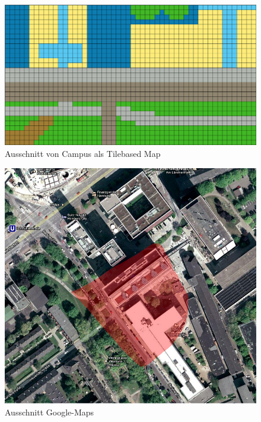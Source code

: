 \documentclass[10pt]{scrartcl}
\begin{document}
        
	\begin{figure}[H]
        \centering
                \includegraphics[scale=0.5]{img/tile_map_campus_pic}
        \caption{Ausschnitt von Campus als \glqq Tilebased Map\grqq{}}
        \label{img:tile_map}
	\end{figure}                
        
	\begin{figure}[H]
        \centering
                \includegraphics[scale=0.5]{img/google_maps}
        \caption{Ausschnitt Google-Maps}
        \label{img:google_maps}
	\end{figure}         
  
        
        
\end{document}
